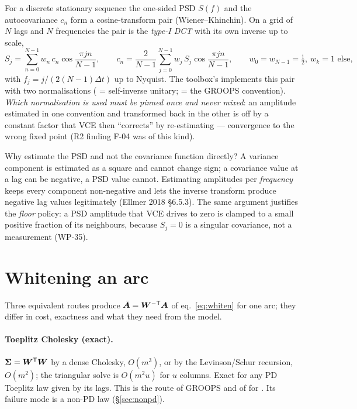 For a discrete stationary sequence the one-sided PSD $S(f)$ and the autocovariance $c_n$ form a cosine-transform pair (Wiener--Khinchin). On a grid of $N$ lags and $N$ frequencies the pair is the \emph{type-I DCT} with its own inverse up to scale,
\begin{equation}
S_j = \sum_{n=0}^{N-1} w_n\, c_n \cos\frac{\pi j n}{N-1}, \qquad
c_n = \frac{2}{N-1}\sum_{j=0}^{N-1} w_j\, S_j \cos\frac{\pi j n}{N-1}, \qquad w_0 = w_{N-1} = \tfrac12,\ w_k = 1 \text{ else},
\label{eq:dct}
\end{equation}
with $f_j = j/(2(N-1)\Delta t)$ up to Nyquist. The toolbox's  implements this pair with two normalisations ( = self-inverse unitary;  = the GROOPS convention). \emph{Which normalisation is used must be pinned once and never mixed}: an amplitude estimated in one convention and transformed back in the other is off by a constant factor that VCE then ``corrects'' by re-estimating --- convergence to the wrong fixed point (R2 finding F-04 was of this kind).

Why estimate the PSD and not the covariance function directly? A variance component is estimated as a square and cannot change sign; a covariance value at a lag can be negative, a PSD value cannot. Estimating amplitudes per \emph{frequency} keeps every component non-negative and lets the inverse transform produce negative lag values legitimately (Ellmer 2018 §6.5.3). The same argument justifies the \emph{floor} policy: a PSD amplitude that VCE drives to zero is clamped to a small positive fraction of its neighbours, because $S_j = 0$ is a singular covariance, not a measurement (WP-35).

\section{Whitening an arc}
\label{sec:whitening}

Three equivalent routes produce $\bar{\bm{A}} = \bm{W}^{-\mathsf T}\bm{A}$ of eq.~\eqref{eq:whiten} for one arc; they differ in cost, exactness and what they need from the model.

\paragraph{Toeplitz Cholesky (exact).} $\bm{\Sigma} = \bm{W}^{\mathsf T}\bm{W}$ by a dense Cholesky, $O(m^3)$, or by the Levinson/Schur recursion, $O(m^2)$; the triangular solve is $O(m^2 u)$ for $u$ columns. Exact for any PD Toeplitz law given by its lags. This is the route of GROOPS and of  for . Its failure mode is a non-PD law (\S\ref{sec:nonpd}).

